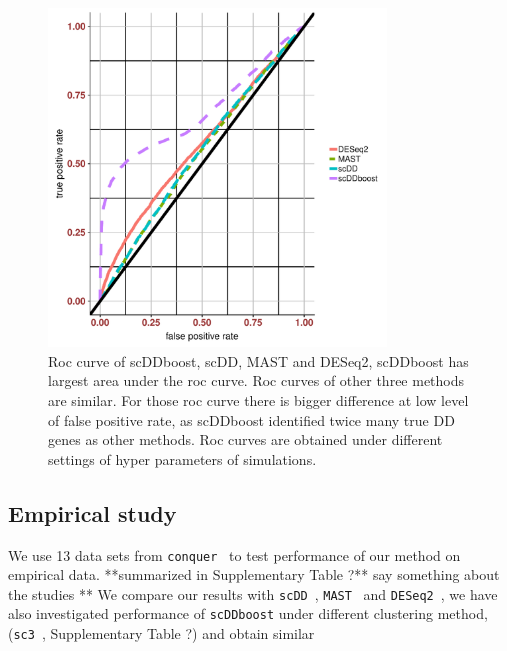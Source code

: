 \documentclass[aoas,preprint]{imsart}
\begin{document}
\begin{figure}[H]
  \includegraphics[width = 0.8\textwidth]{Figs/roc.pdf}
  \caption{Roc curve of scDDboost, scDD, MAST and DESeq2, scDDboost has largest area under the roc curve. Roc curves of other three methods are similar. For those roc curve there is bigger difference at low level of false positive rate, as scDDboost identified twice many true DD genes as other methods.  Roc curves are obtained under different settings of hyper parameters of simulations.}
  \label{fig:5}
\end{figure}




\subsection{Empirical study}


We use 13 data sets from \verb+conquer+~\citep{ref:Cq} to test 
performance of our method on empirical data. **summarized in Supplementary Table ?** say something about
the studies **  We compare our results with 
\verb+scDD+~\citep{ref:scDD}, \verb+MAST+~\citep{ref:MAST} and 
\verb+DESeq2+~\citep{ref:Des}, 
we have also investigated performance of \verb+scDDboost+ under different clustering 
method, (\verb+sc3+~\citep{sc3}, Supplementary Table ?)  and obtain similar 
\end{document}
